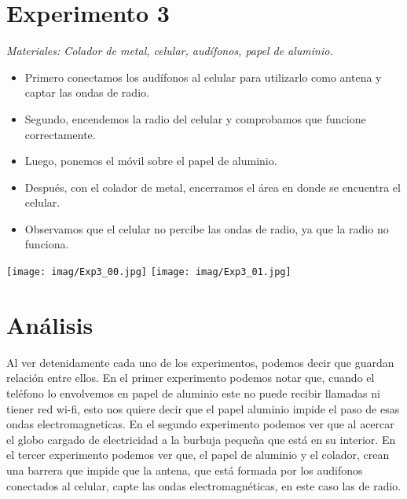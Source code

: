 \documentclass[]{article}
\newenvironment{Figura}
  {\par\medskip\noindent\minipage{\linewidth}}
  {\endminipage\par\medskip}
\begin{document}
\begin{multicols*}{2}
\section*{Experimento 3}
\textit{Materiales: Colador de metal, celular, audífonos, papel de aluminio.}
\vspace{-\topsep}
    \begin{itemize}
       \setlength{\parskip}{0pt} 
       \setlength{\itemsep}{0pt plus 1pt}
        \item Primero conectamos los audífonos al celular para utilizarlo como antena y captar las ondas de radio.
        \item Segundo, encendemos la radio del celular y comprobamos que funcione correctamente.
        \item Luego, ponemos el móvil sobre el papel de aluminio.
        \item Después, con el colador de metal, encerramos el área en donde se encuentra el celular.
        \item Observamos que el celular no percibe las ondas de radio, ya que la radio no funciona.
    \end{itemize}
\vspace{-\topsep}

\begin{Figura}
    \centering
    \texttt{[image: imag/Exp3\_00.jpg]}
    \texttt{[image: imag/Exp3\_01.jpg]}
\end{Figura}


    
\section*{Análisis}
Al ver detenidamente cada uno de los experimentos, podemos decir que guardan relación entre ellos.
En el primer experimento podemos notar que, cuando el teléfono lo envolvemos en papel de aluminio este no puede recibir llamadas ni tiener red wi-fi, esto nos quiere decir que el papel aluminio impide el paso de esas ondas electromagneticas.
En el segundo experimento podemos ver que al acercar el globo cargado de electricidad a la burbuja pequeña que está en su interior.%
En el tercer experimento podemos ver que, el papel de aluminio y el colador, crean una barrera que impide que la antena, que está formada por los audifonos conectados al celular, capte las ondas electromagnéticas, en este caso las de radio.


\end{multicols*}
\end{document}
